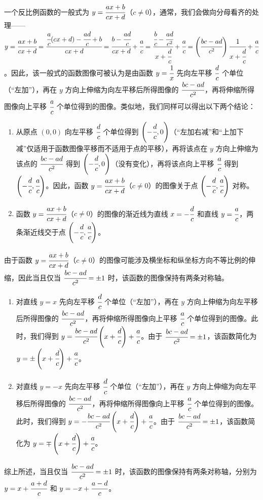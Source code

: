 \documentclass[a4paper]{article}
\begin{document}
一个反比例函数的一般式为 $y = \cfrac{ax + b}{cx + d}$（$c \neq 0$），通常，我们会做向分母看齐的处理——$y = \cfrac{ax + b}{cx + d} = \cfrac{\cfrac{a}{c}(cx + d) - \cfrac{ad}{c} + b}{cx + d} = \cfrac{b - \cfrac{ad}{c}}{cx + d} + \cfrac{a}{c} = \cfrac{\cfrac{b}{c} - \cfrac{ad}{c^2}}{x + \cfrac{d}{c}} + \cfrac{a}{c} = \left(\cfrac{bc - ad}{c^2}\right)\cfrac{1}{x + \cfrac{d}{c}} + \cfrac{a}{c}$。因此，该一般式的函数图像可被认为是由函数 $y = \cfrac{1}{x}$ 先向左平移 $\cfrac{d}{c}$ 个单位（“左加”），再在 $y$ 方向上伸缩为向左平移后所得图像的 $\cfrac{bc - ad}{c^2}$，再将伸缩所得图像向上平移 $\cfrac{a}{c}$ 个单位得到的图像。类似地，我们同样可以得出以下两个结论：

\begin{enumerate}[（1）]
	\item 从原点 $(0, 0)$ 向左平移 $\cfrac{d}{c}$ 个单位得到 $\left(-\cfrac{d}{c}, 0\right)$（“左加右减”和“上加下减”仅适用于函数图像平移而不适用于点的平移），再将该点在 $y$ 方向上伸缩为该点的 $\cfrac{bc - ad}{c^2}$ 得到 $\left(-\cfrac{d}{c}, 0\right)$（没有变化），再将该点向上平移 $\cfrac{a}{c}$ 得到 $\left(-\cfrac{d}{c}, \cfrac{a}{c}\right)$。因此，函数 $y = \cfrac{ax + b}{cx + d}$（$c \neq 0$）的图像关于点 $\left(-\cfrac{d}{c}, \cfrac{a}{c}\right)$ 对称。
	\item 函数 $y = \cfrac{ax + b}{cx + d}$（$c \neq 0$）的图像的渐近线为直线 $x = -\cfrac{d}{c}$ 和直线 $y = \cfrac{a}{c}$，两条渐近线交于点 $\left(-\cfrac{d}{c}, \cfrac{a}{c}\right)$。
\end{enumerate}

由于函数 $y = \cfrac{ax + b}{cx + d}$（$c \neq 0$）的图像可能涉及横坐标和纵坐标方向不等比例的伸缩，因此当且仅当 $\cfrac{bc - ad}{c^2} = \pm 1$ 时，该函数的图像保持有两条对称轴。

\begin{enumerate}[（1）]
	\item 对直线 $y = x$ 先向左平移 $\cfrac{d}{c}$ 个单位（“左加”），再在 $y$ 方向上伸缩为向左平移后所得图像的 $\cfrac{bc - ad}{c^2}$，再将伸缩所得图像向上平移 $\cfrac{a}{c}$ 个单位得到的图像。此时，我们得到 $y = \cfrac{bc - ad}{c^2}\left(x + \cfrac{d}{c}\right) + \cfrac{a}{c}$。由于 $\cfrac{bc - ad}{c^2} = \pm 1$，该函数简化为 $y = \pm\left(x + \cfrac{d}{c}\right) + \cfrac{a}{c}$。
	\item 对直线 $y = -x$ 先向左平移 $\cfrac{d}{c}$ 个单位（“左加”），再在 $y$ 方向上伸缩为向左平移后所得图像的 $\cfrac{bc - ad}{c^2}$，再将伸缩所得图像向上平移 $\cfrac{a}{c}$ 个单位得到的图像。此时，我们得到 $y = -\cfrac{bc - ad}{c^2}\left(x + \cfrac{d}{c}\right) + \cfrac{a}{c}$。由于 $\cfrac{bc - ad}{c^2} = \pm 1$，该函数简化为 $y = \mp\left(x + \cfrac{d}{c}\right) + \cfrac{a}{c}$。
\end{enumerate}

综上所述，当且仅当 $\cfrac{bc - ad}{c^2} = \pm 1$ 时，该函数的图像保持有两条对称轴，分别为 $y = x + \cfrac{a + d}{c}$ 和 $y = -x + \cfrac{a - d}{c}$。
\end{document}
